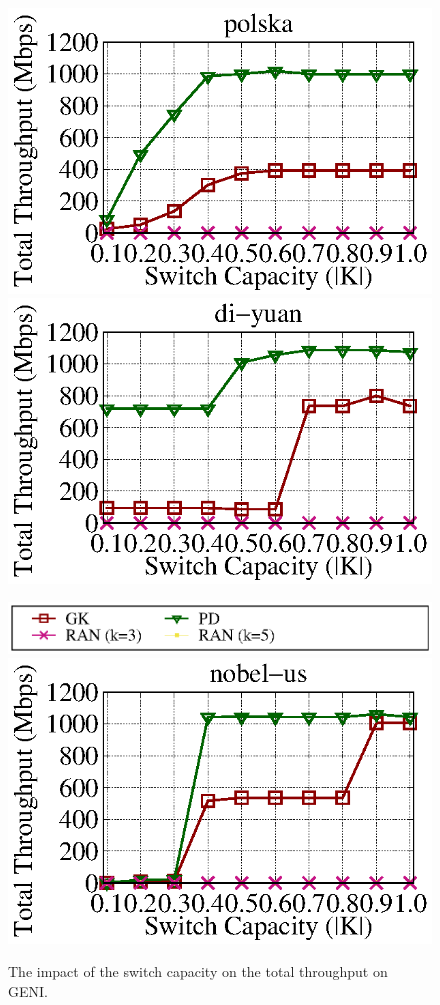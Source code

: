 \documentclass[a4paper,12pt]{report}
\begin{document}
\begin{CJK*}{UTF8}{bkai}
\begin{large}
\begin{figure}[ht]
	  \includegraphics[width=1.0\textwidth]{polska_geni_throughput_e05.eps}
	  \includegraphics[width=1.0\textwidth]{di-yuan_geni_throughput_e05.eps}
  \end{figure}
  \begin{figure}[ht]
    \caption{The impact of the switch capacity on the total throughput on GENI.}
	\centering
	  \includegraphics[width=1.0\textwidth]{lambda_legend.eps}
	  \includegraphics[width=1.0\textwidth]{nobel-us_geni_throughput_e05.eps}

\end{figure}
\end{large}
\end{CJK*}
\end{document}

